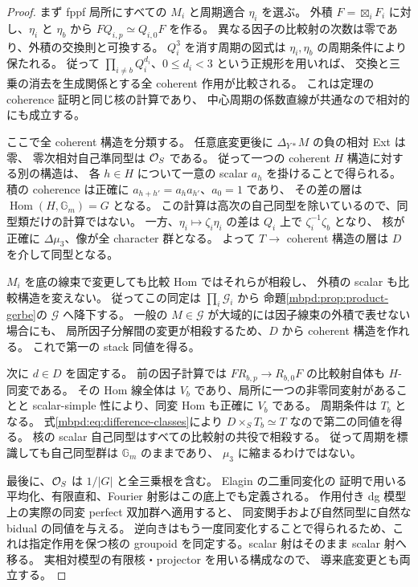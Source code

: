 \begin{proof}
まず fppf 局所にすべての $M_i$ と周期適合 $\eta_i$ を選ぶ。
外積 $F=\boxtimes_iF_i$ に対し、$\eta_i$ と $\eta_b$ から
$FQ_{i,p}\simeq Q_{i,0}F$ を作る。
異なる因子の比較射の次数は零であり、外積の交換則と可換する。
$Q_i^3$ を消す周期の図式は $\eta_i,\eta_b$ の周期条件により保たれる。
従って $\prod_{i\ne b}Q_i^{d_i}$、$0\leq d_i<3$ という正規形を用いれば、
交換と三乗の消去を生成関係とする全 coherent 作用が比較される。
これは定理の coherence 証明と同じ核の計算であり、
中心周期の係数直線が共通なので相対的にも成立する。

ここで全 coherent 構造を分類する。
任意底変更後に $\Delta_{Y*}M$ の負の相対 Ext は零、
零次相対自己準同型は $\mathcal O_S$ である。
従って一つの coherent $H$ 構造に対する別の構造は、
各 $h\in H$ について一意の scalar $a_h$ を掛けることで得られる。
積の coherence は正確に $a_{h+h'}=a_ha_{h'}$、$a_0=1$ であり、
その差の層は $\operatorname{Hom}(H,\mathbb G_m)=G$ となる。
この計算は高次の自己同型を除いているので、同型類だけの計算ではない。
一方、$\eta_i\mapsto\zeta_i\eta_i$ の差は
$Q_i$ 上で $\zeta_i^{-1}\zeta_b$ となり、
核が正確に $\Delta\mu_3$、像が全 character 群となる。
よって $T\to$ coherent 構造の層は $D$ を介して同型となる。

$M_i$ を底の線束で変更しても比較 Hom ではそれらが相殺し、
外積の scalar も比較構造を変えない。
従ってこの同定は $\prod_i\mathscr G_i$ から
命題\ref{mbpd:prop:product-gerbe}の $\mathscr G$ へ降下する。
一般の $M\in\mathscr G$ が大域的には因子線束の外積で表せない場合にも、
局所因子分解間の変更が相殺するため、$D$ から coherent 構造を作れる。
これで第一の stack 同値を得る。

次に $d\in D$ を固定する。
前の因子計算では $FR_{b,p}\to R_{b,0}F$ の比較射自体も $H$-同変である。
その Hom 線全体は $V_b$ であり、局所に一つの非零同変射があることと
scalar-simple 性により、同変 Hom も正確に $V_b$ である。
周期条件は $T_b$ となる。
式\eqref{mbpd:eq:difference-classes}により
$D\times_ST_b\simeq T$ なので第二の同値を得る。
核の scalar 自己同型はすべての比較射の共役で相殺する。
従って周期を標識しても自己同型群は $\mathbb G_m$ のままであり、
$\mu_3$ に縮まるわけではない。

最後に、$\mathcal O_S$ は $1/|G|$ と全三乗根を含む。
Elagin の二重同変化\cite[Proposition~4.1, Theorem~4.2, \S8]{MEDElagin}の
証明で用いる平均化、有限直和、Fourier 射影はこの底上でも定義される。
作用付き dg 模型上の実際の同変 perfect 双加群へ適用すると、
同変関手および自然同型に自然な bidual の同値を与える。
逆向きはもう一度同変化することで得られるため、これは指定作用を保つ核の
groupoid を同定する。scalar 射はそのまま scalar 射へ移る。
実相対模型の有限核・projector を用いる構成なので、
導来底変更とも両立する。
\end{proof}

